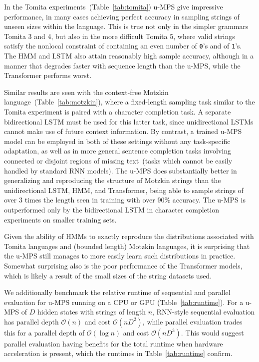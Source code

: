 In the Tomita experiments~(Table~\ref{tab:tomita}) u-MPS give impressive performance, in many cases achieving perfect accuracy in sampling strings of unseen sizes within the language. This is true not only in the simpler grammars Tomita 3 and 4, but also in the more difficult Tomita 5, where valid strings satisfy the nonlocal constraint of containing an even number of \texttt{0}'s and of \texttt{1}'s. The HMM and LSTM also attain reasonably high sample accuracy, although in a manner that degrades faster with sequence length than the u-MPS, while the Transformer performs worst.

Similar results are seen with the context-free Motzkin language~(Table~\ref{tab:motzkin}), where a fixed-length sampling task similar to the Tomita experiment is paired with a character completion task. A separate bidirectional LSTM must be used for this latter task, since unidirectional LSTMs cannot make use of future context information. By contrast, a trained u-MPS model can be employed in both of these settings without any task-specific adaptation, as well as in more general sentence completion tasks involving connected or disjoint regions of missing text~(tasks which cannot be easily handled by standard RNN models). The u-MPS does substantially better in generalizing and reproducing the structure of Motzkin strings than the unidirectional LSTM, HMM, and Transformer, being able to sample strings of over 3 times the length seen in training with over 90\% accuracy. The u-MPS is outperformed only by the bidirectional LSTM in character completion experiments on smaller training sets.

Given the ability of HMMs to exactly reproduce the distributions associated with Tomita languages and (bounded length) Motzkin languages, it is surprising that the u-MPS still manages to more easily learn such distributions in practice. Somewhat surprising also is the poor performance of the Transformer models, which is likely a result of the small sizes of the string datasets used.

We additionally benchmark the relative runtime of sequential and parallel evaluation for u-MPS running on a CPU or GPU (Table~\ref{tab:runtime}). For a u-MPS of $D$ hidden states with strings of length $n$, RNN-style sequential evaluation has parallel depth $\mathcal{O}(n)$ and cost $\mathcal{O}(nD^2)$, while parallel evaluation trades this for a parallel depth of $\mathcal{O}(\log n)$ and cost $\mathcal{O}(nD^3)$. This would suggest parallel evaluation having benefits for the total runtime when hardware acceleration is present, which the runtimes in Table~\ref{tab:runtime} confirm.

